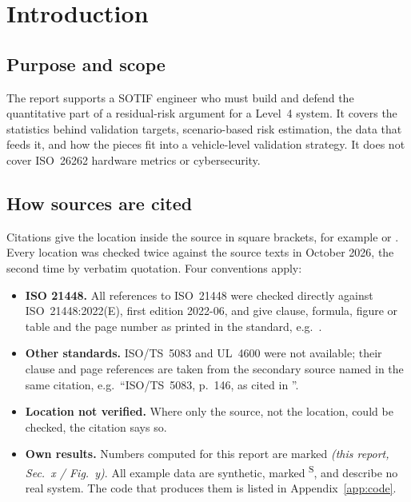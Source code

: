 \documentclass[11pt,a4paper]{article}
\newcommand{\own}[1]{\textit{(this report, #1)}}
\newcommand{\synthetic}{\textsuperscript{\textsf{S}}}
\begin{document}
\clearpage
\tableofcontents
\clearpage

\section{Introduction}
\subsection{Purpose and scope}
The report supports a SOTIF engineer who must build and defend the quantitative part of a residual-risk argument for a Level~4 system. It covers the statistics behind validation targets, scenario-based risk estimation, the data that feeds it, and how the pieces fit into a vehicle-level validation strategy. It does not cover ISO~26262 hardware metrics or cybersecurity.

\subsection{How sources are cited}
Citations give the location inside the source in square brackets, for example \cite[Sec.~IV-B, Eq.~(1)]{putze2023} or \cite[p.~3, Eq.~2]{kalra2016}. Every location was checked twice against the source texts in October 2026, the second time by verbatim quotation. Four conventions apply:
\begin{itemize}
\item \textbf{ISO 21448.} All references to ISO~21448 were checked directly against ISO~21448:2022(E), first edition 2022-06, and give clause, formula, figure or table and the page number as printed in the standard, e.g.\ \cite[C.3, Formula (C.7), p.~137]{iso21448}.
\item \textbf{Other standards.} ISO/TS~5083 and UL~4600 were not available; their clause and page references are taken from the secondary source named in the same citation, e.g.\ ``ISO/TS~5083, p.~146, as cited in \cite[Sec.~I]{betschinske2025}''.
\item \textbf{Location not verified.} Where only the source, not the location, could be checked, the citation says so.
\item \textbf{Own results.} Numbers computed for this report are marked \own{Sec.~x / Fig.~y}. All example data are synthetic, marked \synthetic, and describe no real system. The code that produces them is listed in Appendix~\ref{app:code}.
\end{itemize}
\end{document}
